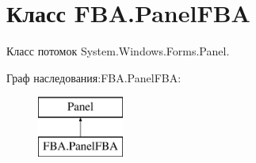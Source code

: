 \hypertarget{class_f_b_a_1_1_panel_f_b_a}{}\section{Класс F\+B\+A.\+Panel\+F\+BA}
\label{class_f_b_a_1_1_panel_f_b_a}


Класс потомок System.\+Windows.\+Forms.\+Panel.  


Граф наследования\+:F\+B\+A.\+Panel\+F\+BA\+:\begin{figure}[H]
\begin{center}
\leavevmode
\includegraphics[height=2.000000cm]{class_f_b_a_1_1_panel_f_b_a}
\end{center}
\end{figure}

